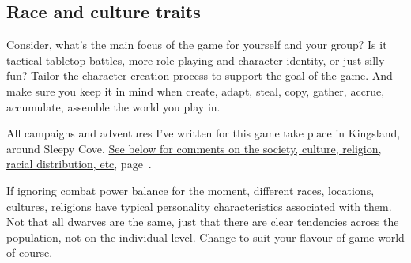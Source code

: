 \subsection*{Race and culture traits}
Consider, what's the main focus of the game for yourself and your group? Is it tactical tabletop battles, more role playing and character identity, or just silly fun? Tailor the character creation process to support the goal of the game. And make sure you keep it in mind when create, adapt, steal, copy, gather, accrue, accumulate, assemble the world you play in.

All campaigns and adventures I've written for this game take place in Kingsland, around Sleepy Cove. \hyperref[sec:kingslandsociety]{See below for comments on the society, culture, religion, racial distribution, etc}, page~\pageref{sec:kingslandsociety}.

If ignoring combat power balance for the moment, different races, locations, cultures, religions have typical personality characteristics associated with them. Not that all dwarves are the same, just that there are clear tendencies across the population, not on the individual level. Change to suit your flavour of game world of course.

